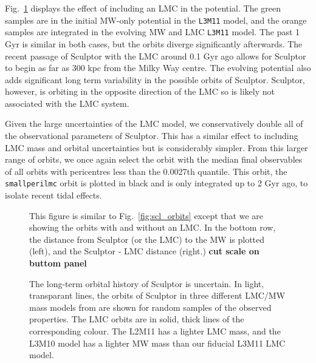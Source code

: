 Fig.~\ref{fig:scl_lmc_orbits_effect} displays the effect of including an
LMC in the potential. The green samples are in the initial MW-only
potential in the \texttt{L3M11} model, and the orange samples are
integrated in the evolving MW and LMC \texttt{L3M11} model. The past 1
Gyr is similar in both cases, but the orbits diverge significantly
afterwards. The recent passage of Sculptor with the LMC around 0.1 Gyr
ago allows for Sculptor to begin as far as 300 kpc from the Milky Way
centre. The evolving potential also adds significant long term
variability in the possible orbits of Sculptor. Sculptor, however, is
orbiting in the opposite direction of the LMC so is likely not
associated with the LMC system.

Given the large uncertainties of the LMC model, we conservatively double
all of the observational parameters of Sculptor. This has a similar
effect to including LMC mass and orbital uncertainties but is
considerably simpler. From this larger range of orbits, we once again
select the orbit with the median final observables of all orbits with
pericentres less than the 0.0027th quantile. This orbit, the
\texttt{smallperilmc} orbit is plotted in black and is only integrated
up to 2 Gyr ago, to isolate recent tidal effects.

\begin{figure}
\centering
{}
\caption[Sculptor Orbits with LMC]{This figure is similar to
Fig.~\ref{fig:scl_orbits} except that we are showing the orbits with and
without an LMC. In the bottom row, the distance from Sculptor (or the
LMC) to the MW is plotted (left), and the Sculptor - LMC distance
(right.) \textbf{cut scale on buttom
panel}}\label{fig:scl_lmc_orbits_effect}
\end{figure}

\begin{figure}
\centering
{}
\caption[Sculptor Orbits with LMC]{The long-term orbital history of
Sculptor is uncertain. In light, transparant lines, the orbits of
Sculptor in three different LMC/MW mass models from \citet{vasiliev2024}
are shown for random samples of the observed properties. The LMC orbits
are in solid, thick lines of the corresponding colour. The L2M11 has a
lighter LMC mass, and the L3M10 model has a lighter MW mass than our
fiducial L3M11 LMC model.}\label{fig:scl_lmc_orbits_mass}
\end{figure}

